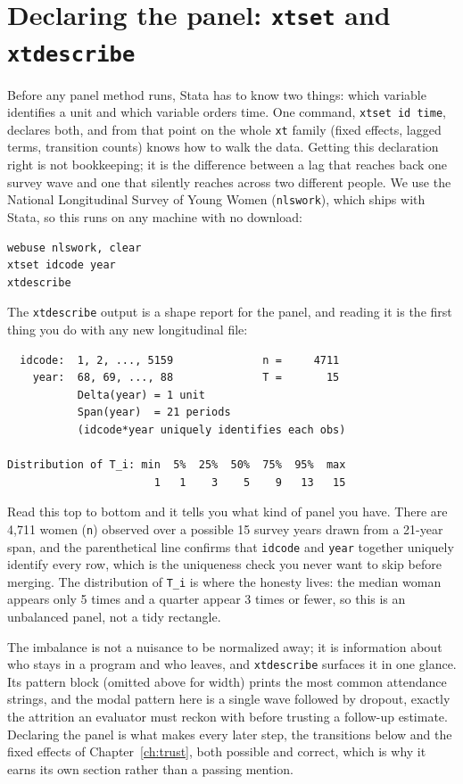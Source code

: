 \documentclass[
    a4paper,
    fontsize=10pt,
    twoside=true,
    numbers=noenddot,
]{kaobook}
\begin{document}
\section{Declaring the panel: \texttt{xtset} and \texttt{xtdescribe}}\label{sec:xtset}
Before any panel method runs, Stata has to know two things: which variable identifies a unit and which variable orders time. One command, \texttt{xtset id time}, declares both, and from that point on the whole \texttt{xt} family (fixed effects, lagged terms, transition counts) knows how to walk the data. Getting this declaration right is not bookkeeping; it is the difference between a lag that reaches back one survey wave and one that silently reaches across two different people. We use the National Longitudinal Survey of Young Women (\texttt{nlswork}), which ships with Stata, so this runs on any machine with no download:
{\footnotesize
\begin{verbatim}
webuse nlswork, clear
xtset idcode year
xtdescribe
\end{verbatim}
}
The \texttt{xtdescribe} output is a shape report for the panel, and reading it is the first thing you do with any new longitudinal file:
{\footnotesize
\begin{verbatim}
  idcode:  1, 2, ..., 5159              n =     4711
    year:  68, 69, ..., 88              T =       15
           Delta(year) = 1 unit
           Span(year)  = 21 periods
           (idcode*year uniquely identifies each obs)

Distribution of T_i: min  5%  25%  50%  75%  95%  max
                       1   1    3    5    9   13   15
\end{verbatim}
}
Read this top to bottom and it tells you what kind of panel you have. There are 4{,}711 women (\texttt{n}) observed over a possible 15 survey years drawn from a 21-year span, and the parenthetical line confirms that \texttt{idcode} and \texttt{year} together uniquely identify every row, which is the uniqueness check you never want to skip before merging. The distribution of \texttt{T\_i} is where the honesty lives: the median woman appears only 5 times and a quarter appear 3 times or fewer, so this is an unbalanced panel, not a tidy rectangle.

The imbalance is not a nuisance to be normalized away; it is information about who stays in a program and who leaves, and \texttt{xtdescribe} surfaces it in one glance. Its pattern block (omitted above for width) prints the most common attendance strings, and the modal pattern here is a single wave followed by dropout, exactly the attrition an evaluator must reckon with before trusting a follow-up estimate. Declaring the panel is what makes every later step, the transitions below and the fixed effects of Chapter~\ref{ch:trust}, both possible and correct, which is why it earns its own section rather than a passing mention.
\end{document}
